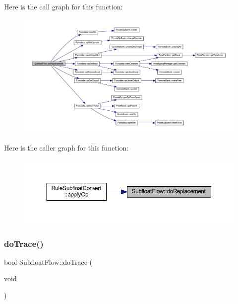 Here is the call graph for this function\+:
\nopagebreak
\begin{figure}[H]
\begin{center}
\leavevmode
\includegraphics[width=350pt]{class_subfloat_flow_ad9a5a1b26c82e8855d9eba6dcca0719c_cgraph}
\end{center}
\end{figure}
Here is the caller graph for this function\+:
\nopagebreak
\begin{figure}[H]
\begin{center}
\leavevmode
\includegraphics[width=350pt]{class_subfloat_flow_ad9a5a1b26c82e8855d9eba6dcca0719c_icgraph}
\end{center}
\end{figure}
\mbox{\label{class_subfloat_flow_a3dcd19f6211a8050c6a24759b1c90bd5}} 
\subsubsection{\texorpdfstring{doTrace()}{doTrace()}}
{\footnotesize\ttfamily bool Subfloat\+Flow\+::do\+Trace (\begin{DoxyParamCaption}\item[{void}]{ }\end{DoxyParamCaption})}



